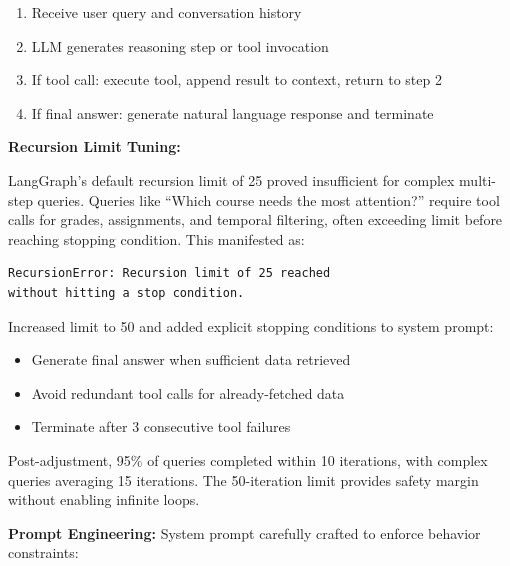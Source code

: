 \documentclass{article}
\begin{document}
\begin{enumerate}
    \item Receive user query and conversation history
    \item LLM generates reasoning step or tool invocation
    \item If tool call: execute tool, append result to context, return to step 2
    \item If final answer: generate natural language response and terminate
\end{enumerate}

\textbf{Recursion Limit Tuning:}

LangGraph's default recursion limit of 25 proved insufficient for complex multi-step queries. Queries like ``Which course needs the most attention?'' require tool calls for grades, assignments, and temporal filtering, often exceeding limit before reaching stopping condition. This manifested as:

\begin{verbatim}
RecursionError: Recursion limit of 25 reached 
without hitting a stop condition.
\end{verbatim}

Increased limit to 50 and added explicit stopping conditions to system prompt:
\begin{itemize}
    \item Generate final answer when sufficient data retrieved
    \item Avoid redundant tool calls for already-fetched data
    \item Terminate after 3 consecutive tool failures
\end{itemize}

Post-adjustment, 95\% of queries completed within 10 iterations, with complex queries averaging 15 iterations. The 50-iteration limit provides safety margin without enabling infinite loops.

\textbf{Prompt Engineering:} System prompt carefully crafted to enforce behavior constraints:
\end{document}
